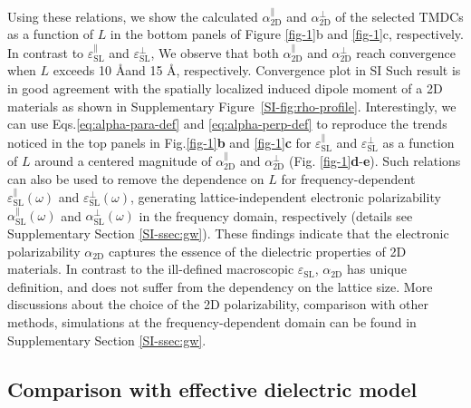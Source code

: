 \documentclass[journal=ancac3,manuscript=article,email=true,hyperref=true,keywords=false]{achemso}
\begin{document}
%
%
Using these relations, we show the calculated
$\alpha_{\mathrm{2D}}^{\parallel}$ and $\alpha_{\mathrm{2D}}^{\perp}$
of the selected TMDCs as a function of $L$ in the bottom panels of
Figure \ref{fig-1}b and \ref{fig-1}c, respectively.  In contrast to
$\varepsilon_{\mathrm{SL}}^{\parallel}$ and
$\varepsilon_{\mathrm{SL}}^{\perp}$, We observe that both
$\alpha_{\mathrm{2D}}^{\parallel}$ and $\alpha_{\mathrm{2D}}^{\perp}$
reach convergence when $L$ exceeds 10 \AA and 15 \AA, respectively.
{\color{red} Convergence plot in SI} Such result is in good agreement
with the spatially localized induced dipole moment of a 2D materials
as shown in Supplementary Figure~\ref{SI-fig:rho-profile}. 
%
%
Interestingly, we can use Eqs.\ref{eq:alpha-para-def} and
\ref{eq:alpha-perp-def} to reproduce the trends noticed in the top
panels in Fig.\ref{fig-1}{\textbf b} and \ref{fig-1}{\textbf c} for
$\varepsilon_{\mathrm{SL}}^{\parallel}$ and
$\varepsilon_{\mathrm{SL}}^{\perp}$ as a function of $L$ around a
centered magnitude of $\alpha_{\mathrm{2D}}^{\parallel}$ and
$\alpha_{\mathrm{2D}}^{\perp}$
(Fig. \ref{fig-1}\textbf{d}-\textbf{e}).
Such relations can also be used to remove the dependence on $L$ for
frequency-dependent $\varepsilon^{\parallel}_{\mathrm{SL}}(\omega)$
and $\varepsilon^{\perp}_{\mathrm{SL}}(\omega)$, generating
lattice-independent electronic polarizability
$\alpha^{\parallel}_{\mathrm{SL}}(\omega)$ and
$\alpha^{\perp}_{\mathrm{SL}}(\omega)$ in the frequency domain,
respectively (details see Supplementary Section \ref{SI-ssec:gw}).
%
% 
% 
% 
% 
These findings indicate that the electronic polarizability $\alpha_{\mathrm{2D}}$ captures the essence
of the dielectric properties of 2D materials. In contrast to the ill-defined macroscopic $\varepsilon_{\mathrm{SL}}$, $\alpha_{\mathrm{2D}}$ has unique definition, and does not suffer from the dependency on the lattice size.
More discussions about the choice of the
2D polarizability, comparison with other methods, simulations at the
frequency-dependent domain can be found in Supplementary Section
\ref{SI-ssec:gw}.

\subsection{Comparison with effective dielectric model}
\label{sec:comp-with-effect}
\end{document}

